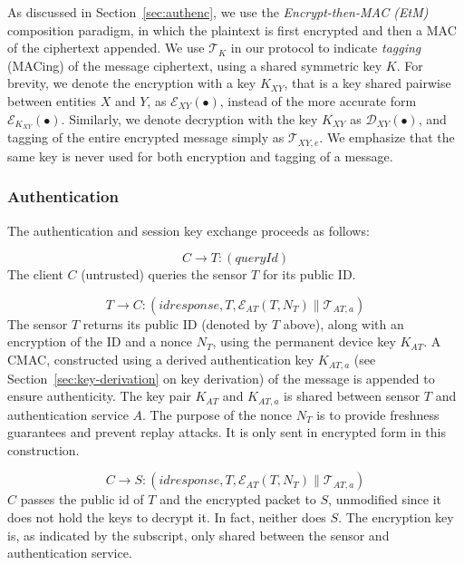 As discussed in Section~\ref{sec:authenc}, we use the \textit{Encrypt-then-MAC (EtM)}  composition paradigm, in which the plaintext is first encrypted and then a MAC of the ciphertext appended. We use $\mathcal{T}_K$ in our protocol to indicate \textit{tagging} (MACing) of the message ciphertext, using a shared symmetric key $K$. 
%
For brevity, we denote the encryption with a key $K_{XY}$, that is a key shared pairwise between entities $X$ and $Y$, as $\mathcal{E}_{XY}(\bullet)$, instead of the more accurate form $\mathcal{E}_{K_{XY}}(\bullet)$. Similarly, we denote decryption with the key $K_{XY}$ as $\mathcal{D}_{XY}(\bullet)$, and tagging of the entire encrypted message simply as $\mathcal{T}_{XY,e}$. We emphasize that the same key is never used for both encryption and tagging of a message.

\subsubsection{Authentication}

The authentication and session key exchange proceeds as follows:

\[
C \rightarrow T: (\textit{queryId})
\]
%
The client $C$ (untrusted) queries the sensor $T$ for its public ID.

\[
T \rightarrow C: (\textit{idresponse}, T, \mathcal{E}_{AT}(T, N_T) \parallel \mathcal{T}_{AT,a})
\]
%
The sensor $T$ returns its public ID (denoted by $T$ above), along with an encryption of 
the ID and a nonce $N_T$, using the permanent device key $K_{AT}$. A CMAC, constructed using a derived authentication key $K_{AT,a}$ 
(see Section~\ref{sec:key-derivation} on key derivation) of the message is appended to ensure authenticity. 
The key pair $K_{AT}$ and $K_{AT,a}$ is shared between sensor $T$ and authentication service $A$.
The purpose of the nonce $N_T$ is to provide freshness guarantees and prevent replay attacks. 
It is only sent in encrypted form in this construction.

\[
C\rightarrow S: (\textit{idresponse},T,\mathcal{E}_{AT}(T,N_T) \parallel \mathcal{T}_{AT,a})
\]
%
$C$ passes the public id of $T$ and the encrypted packet to $S$, unmodified since it does not hold the keys to decrypt it. In fact, neither does $S$. The encryption key is, as indicated by the subscript, only shared between the sensor and authentication service.

